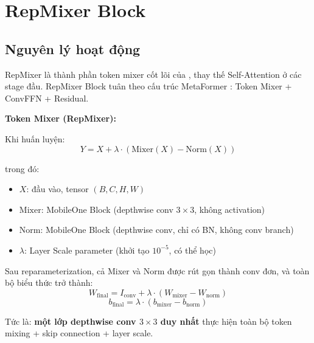 \section{RepMixer Block}
\label{sec:repmixer}

\subsection{Nguyên lý hoạt động}
\label{subsec:repmixer_principle}

RepMixer là thành phần token mixer cốt lõi của \fastvit{}, thay thế Self-Attention ở các stage đầu. RepMixer Block tuân theo cấu trúc MetaFormer \cite{metaformer2022}: Token Mixer + ConvFFN + Residual.

\textbf{Token Mixer (RepMixer):}

Khi huấn luyện:
\begin{equation}
    Y = X + \lambda \cdot \left(\text{Mixer}(X) - \text{Norm}(X)\right)
    \label{eq:repmixer_train}
\end{equation}

\noindent trong đó:
\begin{itemize}
    \item $X$: đầu vào, tensor $(B, C, H, W)$
    \item $\text{Mixer}$: MobileOne Block (depthwise conv $3 \times 3$, không activation)
    \item $\text{Norm}$: MobileOne Block (depthwise conv, chỉ có BN, không conv branch)
    \item $\lambda$: Layer Scale parameter (khởi tạo $10^{-5}$, có thể học)
\end{itemize}

Sau reparameterization, cả Mixer và Norm được rút gọn thành conv đơn, và toàn bộ biểu thức trở thành:
\begin{equation}
    W_{\text{final}} = I_{\text{conv}} + \lambda \cdot (W_{\text{mixer}} - W_{\text{norm}})
    \label{eq:repmixer_fused_w}
\end{equation}
\begin{equation}
    b_{\text{final}} = \lambda \cdot (b_{\text{mixer}} - b_{\text{norm}})
    \label{eq:repmixer_fused_b}
\end{equation}

\noindent Tức là: \textbf{một lớp depthwise conv $3 \times 3$ duy nhất} thực hiện toàn bộ token mixing + skip connection + layer scale.

